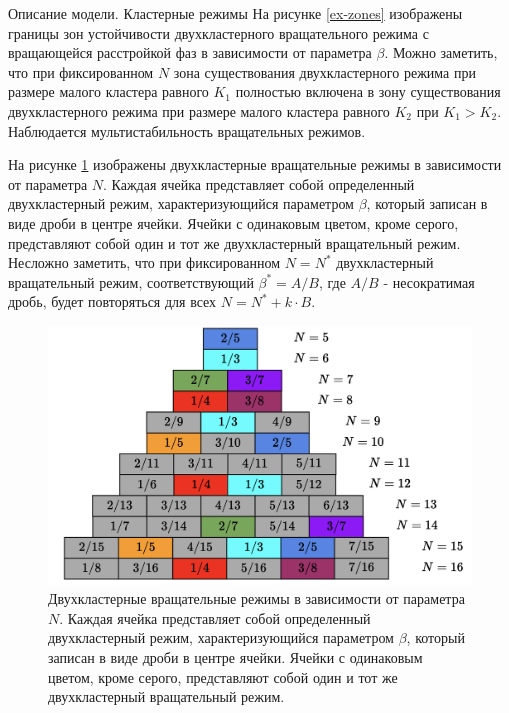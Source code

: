 \begin{chapter}{Описание модели. Кластерные режимы}
	На рисунке \ref{ex-zones} изображены границы зон устойчивости двухкластерного вращательного режима
	с вращающейся расстройкой фаз в зависимости от параметра $\beta$.
	Можно заметить, что при фиксированном $N$ зона существования двухкластерного режима при размере малого кластера равного $K_1$ полностью включена в 
	зону существования двухкластерного режима при размере малого кластера равного $K_2$ при $K_1 > K_2$. Наблюдается мультистабильность вращательных режимов.


	На рисунке \ref{schema} изображены двухкластерные вращательные режимы в зависимости от параметра $N$.
	Каждая ячейка представляет собой определенный двухкластерный режим,
	характеризующийся параметром $\beta$, который записан в виде дроби в центре ячейки. Ячейки с одинаковым цветом, кроме серого, представляют собой
	один и тот же двухкластерный вращательный режим. Несложно заметить, что при фиксированном $N = N^*$
	двухкластерный вращательный режим, соответствующий $\beta^* = A/B$, где $A/B$ - несократимая дробь, 
	будет повторяться для всех $N = N^* + k\cdot B$. 

	\begin{figure}[h!]
		\begin{center}
			\includegraphics[width=1\columnwidth]{pictures/schema.png}
		\end{center}
		\caption{Двухкластерные вращательные режимы в зависимости от параметра $N$. Каждая ячейка представляет собой определенный двухкластерный режим,
		характеризующийся параметром $\beta$, который записан в виде дроби в центре ячейки. Ячейки с одинаковым цветом, кроме серого, представляют собой
		один и тот же двухкластерный вращательный режим.}
		\label{schema}
	\end{figure}

\end{chapter}
